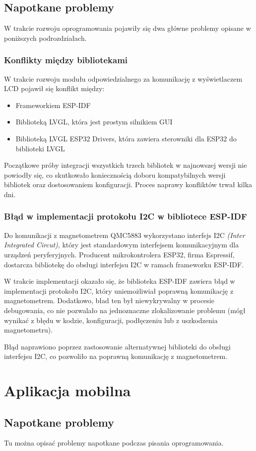 \subsection{Napotkane problemy}
W trakcie rozwoju oprogramowania pojawiły się dwa główne problemy opisane w poniższych podrozdziałach.
\subsubsection{Konflikty między bibliotekami}
W trakcie rozwoju modułu odpowiedzialnego za komunikację z wyświetlaczem LCD pojawił się konflikt między:
\begin{itemize}
    \item Frameworkiem ESP-IDF
    \item Biblioteką LVGL,\cite{lvgl-esp32-port} która jest prostym silnikiem GUI
    \item Biblioteką LVGL ESP32 Drivers, \cite{lvgl-esp32-drivers} która zawiera sterowniki dla ESP32 do biblioteki LVGL
\end{itemize}
Początkowe próby integracji wszystkich trzech bibliotek w najnowszej wersji nie powiodły się,
co skutkowało koniecznością doboru kompatybilnych wersji bibliotek oraz dostosowaniem konfiguracji.
Proces naprawy konfliktów trwał kilka dni.

\subsubsection{Błąd w implementacji protokołu I2C w bibliotece ESP-IDF}
Do komunikacji z magnetometrem QMC5883 wykorzystano interfejs I2C \textit{(Inter Integrated Circut)}, który jest standardowym interfejsem komunikacyjnym dla urządzeń peryferyjnych.
Producent mikrokontrolera ESP32, firma Espressif, dostarcza bibliotekę do obsługi interfejsu I2C w ramach frameworku ESP-IDF.

W trakcie implementacji okazało się, że biblioteka ESP-IDF zawiera błąd w implementacji protokołu I2C, który uniemożliwiał poprawną komunikację z magnetometrem.
Dodatkowo, bład ten był niewykrywalny w procesie debugowania, co nie pozwalało na jednoznaczne zlokalizowanie problemu (mógł wynikać z błędu w kodzie, konfiguracji, podłęczeniu lub z uszkodzenia magnetometru).

Błąd naprawiono poprzez zastosowanie alternatywnej biblioteki do obsługi interfejsu I2C, co pozwoliło na poprawną komunikację z magnetometrem.

\section{Aplikacja mobilna}
\subsection{Napotkane problemy}
Tu można opisać problemy napotkane podczas pisania oprogramowania.